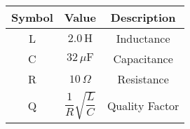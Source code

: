 

\begin{tabular}{|c|c|c|}
    \hline
     \textbf{Symbol} & \textbf{Value} &
     \textbf{Description}\\
    \hline
     L &  $2.0\,
     \text{H}$ & Inductance\\
    \hline 
     C &  $32\, \mu\text{F}$ & Capacitance \\
    \hline
     R &  $10\, \Omega$ & Resistance\\
    \hline
     Q & $\dfrac{1}{R}\sqrt{\dfrac{L}{C}}$ & Quality Factor\\[6pt]
    \hline
\end{tabular}
